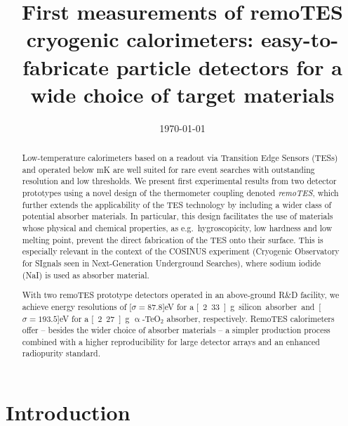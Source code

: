 \documentclass[superscriptaddress,nofootinbib ]{revtex4-2}
\begin{document}
\title{First measurements of remoTES cryogenic calorimeters: easy-to-fabricate particle detectors for a wide choice of target materials}



\date{\today}


\begin{abstract}
Low-temperature calorimeters based on a readout via Transition Edge Sensors (TESs) and operated below \unit[100]{mK} are well suited for rare event searches with outstanding resolution and low thresholds. We present first experimental results from two detector prototypes using a novel design of the thermometer coupling denoted \textit{remoTES}, which further extends the applicability of the TES technology by including a wider class of potential absorber materials. In particular, this design facilitates the use of materials whose physical and chemical properties, as e.g.~hygroscopicity, low hardness and low melting point, prevent the direct fabrication of the TES onto their surface. This is especially relevant in the context of the COSINUS experiment (Cryogenic Observatory for SIgnals seen in Next-Generation Underground Searches), where sodium iodide (NaI) is used as absorber material.
   
   With two remoTES prototype detectors operated in an above-ground R\&D facility, we achieve energy resolutions of \unit[$\sigma=87.8$]{eV} for a \unit[2.33]{g} silicon absorber and \unit[$\sigma=193.5$]{eV} for a \unit[2.27]{g} $\upalpha$-TeO$_{2}$ absorber, respectively. RemoTES calorimeters offer -- besides the wider choice of absorber materials -- a simpler production process combined with a higher reproducibility for large detector arrays and an enhanced radiopurity standard.
\end{abstract}



\maketitle

\section{Introduction}
\end{document}
